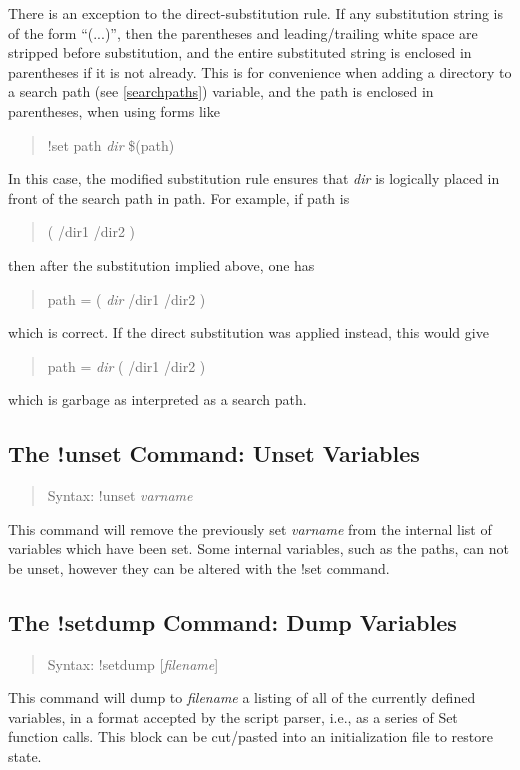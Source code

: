 There is an exception to the direct-substitution rule.  If any
substitution string is of the form ``{\vt (...)}'', then the
parentheses and leading/trailing white space are stripped before
substitution, and the entire substituted string is enclosed in
parentheses if it is not already.  This is for convenience when adding
a directory to a search path (see \ref{searchpaths}) variable, and the
path is enclosed in parentheses, when using forms like
\begin{quote}
\vt !set path {\it dir} \$(path)
\end{quote}
In this case, the modified substitution rule ensures that {\it dir} is
logically placed in front of the search path in {\vt path}.  For
example, if {\vt path} is
\begin{quote}
\vt ( /dir1 /dir2 )
\end{quote}
then after the substitution implied above, one has
\begin{quote}
\vt path = ( {\it dir} /dir1 /dir2 )
\end{quote}
which is correct.  If the direct substitution was applied instead,
this would give
\begin{quote}
\vt path = {\it dir} ( /dir1 /dir2 )
\end{quote}
which is garbage as interpreted as a search path.

\subsection{The {\cb !unset} Command: Unset Variables}
\begin{quote}
Syntax: {\vt !unset} {\it varname}
\end{quote}
This command will remove the previously set {\it varname} from the
internal list of variables which have been set.  Some internal variables,
such as the paths, can not be unset, however they can be altered with the
{\cb !set} command.

\subsection{The {\cb !setdump} Command: Dump Variables}
\begin{quote}
Syntax: {\vt !setdump} [{\it filename\/}]
\end{quote}
This command will dump to {\it filename} a listing of all of the
currently defined variables, in a format accepted by the script
parser, i.e., as a series of {\vt Set} function calls.  This block can
be cut/pasted into an initialization file to restore state.

